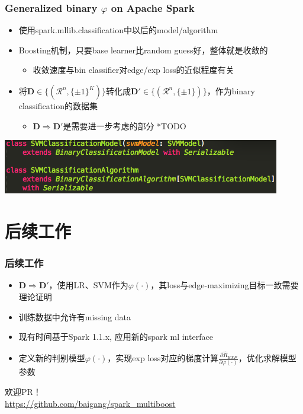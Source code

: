 \documentclass{beamer}
\begin{document}
\begin{frame}
\frametitle{Generalized binary $\varphi$ on Apache Spark}
\begin{itemize}
\item 使用spark.mllib.classification中以后的model/algorithm
\item Boosting机制，只要base learner比random guess好，整体就是收敛的
  \begin{itemize}
    \item 收敛速度与bin classifier对edge/exp loss的近似程度有关
  \end{itemize}
\item 将$\mathbf{D} \in \{(\mathcal{R}^n, \{\pm1\}^K)\}$转化成$\mathbf{D}' \in \{(\mathcal{R}^n, \{\pm1\})\}$，作为binary classification的数据集
  \begin{itemize}
    \item $\mathbf{D} \Rightarrow \mathbf{D}'$是需要进一步考虑的部分 *TODO
  \end{itemize}
\end{itemize}
\includegraphics[scale=0.5]{img/svm_bin.png}
\end{frame}

\section{后续工作}

\begin{frame}
\frametitle{后续工作}
\begin{itemize}
\item $\mathbf{D} \Rightarrow \mathbf{D}'$，使用LR、SVM作为$\varphi(\cdot)$，其loss与edge-maximizing目标一致需要理论证明
\item 训练数据中允许有missing data
\item 现有时间基于Spark 1.1.x, 应用新的spark ml interface
\item 定义新的判别模型$\varphi(\cdot)$，实现exp loss对应的梯度计算$\frac{\partial \hat{R}_{EXP}}{\partial \varphi(\cdot)}$，优化求解模型参数
\end{itemize}

\begin{block}{}
欢迎PR！\\
\href{https://github.com/baigang/spark_multiboost}{https://github.com/baigang/spark\_multiboost}
\end{block}
\end{frame}
\end{document}
